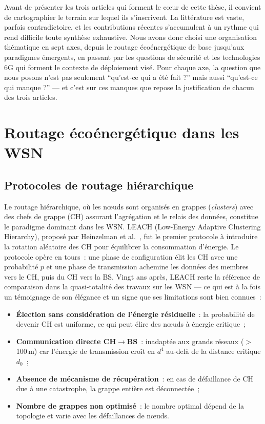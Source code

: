 \label{sec:RevLitt}

Avant de présenter les trois articles qui forment le c\oe{}ur de cette thèse, il convient de cartographier le terrain sur lequel ils s'inscrivent. La littérature est vaste, parfois contradictoire, et les contributions récentes s'accumulent à un rythme qui rend difficile toute synthèse exhaustive. Nous avons donc choisi une organisation thématique en sept axes, depuis le routage écoénergétique de base jusqu'aux paradigmes émergents, en passant par les questions de sécurité et les technologies 6G qui forment le contexte de déploiement visé. Pour chaque axe, la question que nous posons n'est pas seulement ``qu'est-ce qui a été fait ?'' mais aussi ``qu'est-ce qui manque ?'' --- et c'est sur ces manques que repose la justification de chacun des trois articles.

\section{Routage écoénergétique dans les WSN}\label{sec:revlit-routing}

\subsection{Protocoles de routage hiérarchique}

Le routage hiérarchique, où les n\oe{}uds sont organisés en grappes (\emph{clusters}) avec des chefs de grappe (CH) assurant l'agrégation et le relais des données, constitue le paradigme dominant dans les WSN. LEACH (Low-Energy Adaptive Clustering Hierarchy), proposé par Heinzelman et al.\ \cite{heinzelman2000leach,heinzelman2002leach}, fut le premier protocole à introduire la rotation aléatoire des CH pour équilibrer la consommation d'énergie. Le protocole opère en tours~: une phase de configuration élit les CH avec une probabilité $p$ et une phase de transmission achemine les données des membres vers le CH, puis du CH vers la BS. Vingt ans après, LEACH reste la référence de comparaison dans la quasi-totalité des travaux sur les WSN --- ce qui est à la fois un témoignage de son élégance et un signe que ses limitations sont bien connues~:

\begin{itemize}
    \item \textbf{Élection sans considération de l'énergie résiduelle}~: la probabilité de devenir CH est uniforme, ce qui peut élire des n\oe{}uds à énergie critique~;
    \item \textbf{Communication directe CH$\to$BS}~: inadaptée aux grands réseaux ($>$100\,m) car l'énergie de transmission croît en $d^4$ au-delà de la distance critique $d_0$~;
    \item \textbf{Absence de mécanisme de récupération}~: en cas de défaillance de CH due à une catastrophe, la grappe entière est déconnectée~;
    \item \textbf{Nombre de grappes non optimisé}~: le nombre optimal dépend de la topologie et varie avec les défaillances de n\oe{}uds.
\end{itemize}


